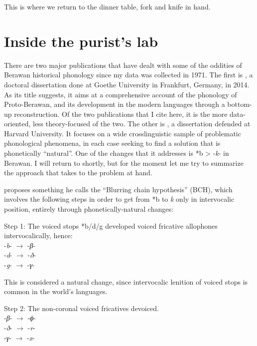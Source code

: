 \documentclass[output=paper]{langscibook}
\begin{document}
This is where we return to the dinner table, fork and knife in hand.

\section{Inside the purist’s lab}\label{sec:Purists-Lab}
 There are two major publications that have dealt with some of the oddities of Berawan historical phonology since my data was collected in 1971. The first is \citet{Burkhardt2014}, a doctoral dissertation done at Goethe University in Frankfurt, Germany, in 2014. As its title suggests, it aims at a comprehensive account of the phonology of Proto-Berawan, and its development in the modern languages through a bottom-up reconstruction. Of the two publications that I cite here, it is the more data-oriented, less theory-focused of the two.  The other is \citet{Beguš2018}, a dissertation defended at Harvard University. It focuses on a wide crosslinguistic sample of problematic phonological phenomena, in each case seeking to find a
solution that is phonetically ``natural''. One of the changes that it addresses is *b > -\textit{k}- in Berawan. I will return to \citet{Burkhardt2014} shortly, but for the moment let me try to summarize the approach that \citet{Beguš2018} takes to the problem at hand.

\citet[122--130]{Beguš2018} proposes something he calls the “Blurring chain hypothesis” (BCH), which involves the following steps in order to get from *b to \textit{k} only in intervocalic position, entirely through phonetically-natural changes:

\ea %
Step 1: The voiced stops *b/d/g developed voiced fricative allophones intervocalically, hence:\\
-\textit{b}-  $\to$  -\textit{β}-\\
-\textit{d}-  $\to$  -\textit{ð}-\\
-\textit{g}-  $\to$  -\textit{γ}-\\
\z

This is considered a natural change, since intervocalic lenition of voiced stops is common in the world’s languages.

\ea
Step 2: The non-coronal voiced fricatives devoiced.\\
-\textit{β}-  $\to$  -\textit{ϕ}-\\
-\textit{ð}-  $\to$  -\textit{r}-\\
-\textit{γ}-  $\to$  -\textit{x}-\\
\z
\end{document}
